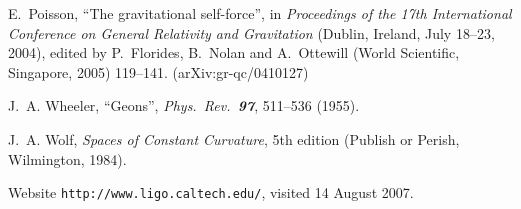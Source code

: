 \documentclass{uonmathreport}
\begin{document}
\begin{thebibliography}{99}
E.~Poisson,
``The gravitational self-force'',
in
{\it Proceedings of the
17th International Conference on General
Relativity and Gravitation\/} (Dublin, Ireland, July 18--23, 2004),
edited by
P.~Florides, B.~Nolan and A.~Ottewill
(World Scientific, Singapore, 2005) 119--141.
(arXiv:gr-qc/0410127)

J.~A. Wheeler,
``Geons'',
{\it Phys.\ Rev.\ \bf 97}, 511--536
(1955).

J.~A. Wolf,
{\it Spaces of Constant Curvature\/},
5th edition
(Publish or Perish, Wilmington, 1984).


Website \texttt{http://www.ligo.caltech.edu/},
visited 14 August 2007.

\end{thebibliography}
\end{document}
